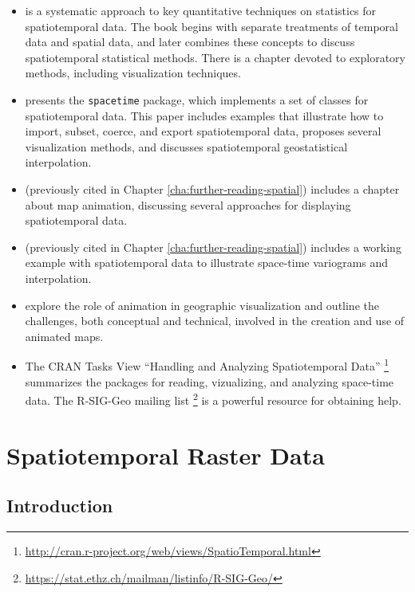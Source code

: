 \documentclass[smallroyalvopaper]{memoir}
\begin{document}
\begin{itemize}
\item \cite{Cressie.Wikle2011} is a systematic approach to key quantitative techniques on statistics for spatiotemporal data. The book begins with separate treatments of temporal data and spatial data, and later combines these concepts to discuss spatiotemporal statistical methods. There is a chapter devoted to exploratory methods, including visualization techniques.

\item \cite{Pebesma2012} presents the \texttt{spacetime} package, which implements a set of classes for spatiotemporal data. This paper includes examples that illustrate how to import, subset, coerce, and export spatiotemporal data, proposes several visualization methods, and discusses spatiotemporal geostatistical interpolation.

\item \cite{Slocum.McMaster.ea2005} (previously cited in Chapter \ref{cha:further-reading-spatial}) includes a chapter about map animation, discussing several approaches for displaying spatiotemporal data.

\item \cite{Hengl2009} (previously cited in Chapter \ref{cha:further-reading-spatial}) includes a working example with spatiotemporal data to illustrate space-time variograms and interpolation.

\item \cite{Harrower.Fabrikant2008} explore the role of animation in geographic visualization and outline the challenges, both conceptual and technical, involved in the creation and use of animated maps.

\item The CRAN Tasks View ``Handling and Analyzing Spatiotemporal Data'' \footnote{\url{http://cran.r-project.org/web/views/SpatioTemporal.html}} summarizes the packages for reading, vizualizing, and analyzing space-time data. The R-SIG-Geo mailing list \footnote{\url{https://stat.ethz.ch/mailman/listinfo/R-SIG-Geo/}} is a powerful resource for obtaining help.
\end{itemize}

\chapter{Spatiotemporal Raster Data}
\label{sec:orge98980e}
\label{cha:rasterST}

\section{Introduction}
\label{sec-1}
\end{document}
